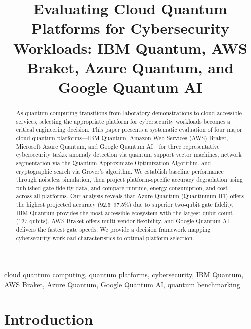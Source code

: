 \documentclass[conference]{IEEEtran}
\begin{document}
\title{Evaluating Cloud Quantum Platforms for Cybersecurity Workloads: IBM Quantum, AWS Braket, Azure Quantum, and Google Quantum AI}

\author{
}

\maketitle

\begin{abstract}
As quantum computing transitions from laboratory demonstrations to cloud-accessible services, selecting the appropriate platform for cybersecurity workloads becomes a critical engineering decision. This paper presents a systematic evaluation of four major cloud quantum platforms---IBM Quantum, Amazon Web Services (AWS) Braket, Microsoft Azure Quantum, and Google Quantum AI---for three representative cybersecurity tasks: anomaly detection via quantum support vector machines, network segmentation via the Quantum Approximate Optimization Algorithm, and cryptographic search via Grover's algorithm. We establish baseline performance through noiseless simulation, then project platform-specific accuracy degradation using published gate fidelity data, and compare runtime, energy consumption, and cost across all platforms. Our analysis reveals that Azure Quantum (Quantinuum H1) offers the highest projected accuracy (92.5--97.5\%) due to superior two-qubit gate fidelity, IBM Quantum provides the most accessible ecosystem with the largest qubit count (127 qubits), AWS Braket offers multi-vendor flexibility, and Google Quantum AI delivers the fastest gate speeds. We provide a decision framework mapping cybersecurity workload characteristics to optimal platform selection.
\end{abstract}

\begin{IEEEkeywords}
cloud quantum computing, quantum platforms, cybersecurity, IBM Quantum, AWS Braket, Azure Quantum, Google Quantum AI, quantum benchmarking
\end{IEEEkeywords}

\section{Introduction}
\end{document}
